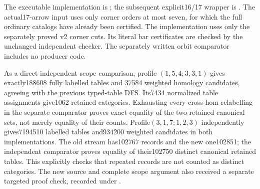 The executable implementation is
; the subsequent explicit16/17
wrapper is .
The actual17-arrow input uses only corner orders at most seven,
for which the full ordinary catalogs have already been certified.
The implementation uses only the separately proved v2 corner
cuts. Its literal bar certificates are checked by the unchanged
independent checker. The separately written orbit comparator
 includes no producer code.

As a direct independent scope comparison, profile
$(1,5,4;3,3,1)$ gives exactly188608 fully labelled tables and
37584 weighted homology candidates, agreeing with the previous
typed-table DFS. Its7434 normalized table assignments give1062
retained categories. Exhausting every cross-hom relabelling in
the separate comparator proves exact equality of the two retained
canonical sets, not merely equality of their counts.
Profile$(3,1,7;1,2,3)$ independently gives7194510 labelled
tables and934200 weighted candidates in both implementations.
The old stream has102767 records and the new one102851;
the independent comparator proves equality of their102750
distinct canonical retained tables. This explicitly checks
that repeated records are not counted as distinct categories.
The new source and complete scope argument also received a
separate targeted proof check, recorded under
.


